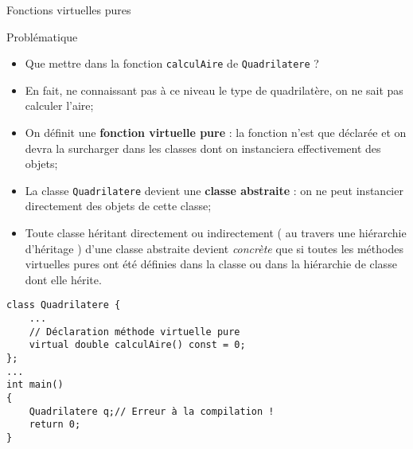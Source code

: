 \documentclass[handout,10pt]{beamer}
\begin{document}
\begin{frame}[fragile]{Fonctions virtuelles pures}
\tiny
\begin{block}{Problématique}
\begin{itemize}
\item Que mettre dans la fonction \lstinline$calculAire$ de \lstinline$Quadrilatere$ ?
\item En fait, ne connaissant pas à ce niveau le type de quadrilatère, on ne sait pas calculer l'aire;
\item On définit une \textbf{fonction virtuelle pure} : la fonction n'est que déclarée et on devra la surcharger dans les classes dont on instanciera effectivement des objets;
\item La classe \lstinline$Quadrilatere$ devient une \textbf{classe abstraite} :
on ne peut instancier directement des objets de cette classe;
\item Toute classe héritant directement ou indirectement ( au travers une hiérarchie d'héritage ) d'une classe abstraite devient \textsl{concrète} que si toutes les méthodes virtuelles pures ont été définies dans la classe ou dans la hiérarchie de classe dont elle hérite.
\end{itemize}
\end{block}
\begin{lstlisting}
class Quadrilatere {
    ...
    // Déclaration méthode virtuelle pure
    virtual double calculAire() const = 0;
};
...
int main()
{
    Quadrilatere q;// Erreur à la compilation !
    return 0;
}
\end{lstlisting}
\end{frame}
\end{document}
